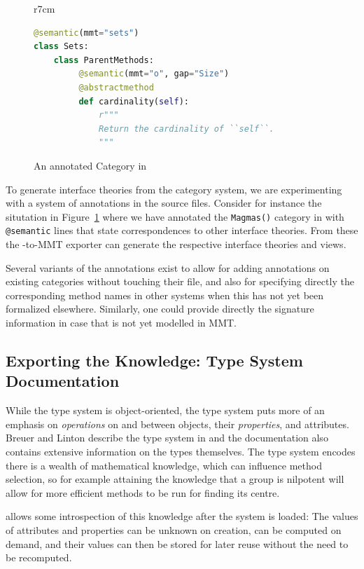 \begin{figure}r{7cm}\vspace*{-2.5em}
\begin{lstlisting}[language=Python]
@semantic(mmt="sets")
class Sets:
    class ParentMethods:
         @semantic(mmt="o", gap="Size")
         @abstractmethod
         def cardinality(self):
             r"""
             Return the cardinality of ``self``.
             """
\end{lstlisting}
\vspace*{-.5em}
\caption{An annotated Category in \Sage}\label{fig:anncat}\vspace*{-1.5em}
\end{figure}
To generate interface theories from the \Sage category system, we are experimenting with a
system of annotations in the \Sage source files. Consider for instance the situtation in
Figure~\ref{fig:anncat} where we have annotated the \texttt{Magmas()} category in \Sage
with \texttt{@semantic} lines that state correspondences to other interface theories. From
these the \Sage-to-MMT exporter can generate the respective interface theories and views.

Several variants of the annotations exist to allow for adding annotations on existing
categories without touching their file, and also for specifying directly the corresponding
method names in other systems when this has not yet been formalized elsewhere. Similarly,
one could provide directly the signature information in case that is not yet modelled in
MMT.

\subsection{Exporting the \GAP Knowledge: Type System Documentation}

While the \Sage type system is object-oriented, the \GAP type system puts more of an
emphasis on \emph{operations} on and between objects, their \emph{properties}, and
attributes. Breuer and Linton describe the \GAP type system in \cite{breuer-linton} and
the \GAP documentation \cite{GAP4} also contains extensive information on the types
themselves. The \GAP type system encodes \GAP there is a wealth of mathematical knowledge,
which can influence method selection, so for example attaining the knowledge that a group
is nilpotent will allow for more efficient methods to be run for finding its centre.

\GAP allows some introspection of this knowledge after the system is loaded: The values of
attributes and properties can be unknown on creation, can be computed on demand, and their
values can then be stored for later reuse without the need to be recomputed.

